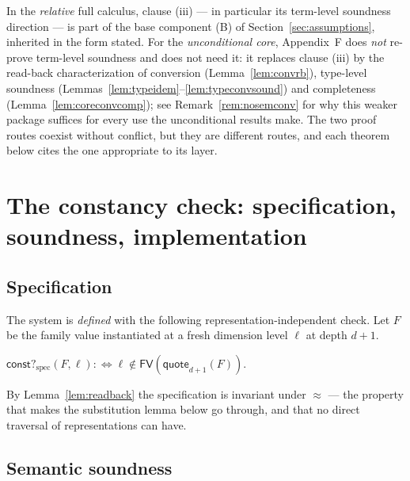 \documentclass{lmcs}
\newcommand{\FV}{\mathsf{FV}}
\newcommand{\repeq}{\approx}
\newcommand{\constspec}{\mathsf{const?}_{\mathrm{spec}}}
\newcommand{\quo}{\mathsf{quote}}
\begin{document}
\begin{rem}
  \label{rem:whichlayer}
  In the \emph{relative} full calculus, clause (iii) --- in
  particular its term-level soundness direction --- is part of the
  base component (B) of Section~\ref{sec:assumptions}, inherited in
  the form stated.  For the \emph{unconditional core}, Appendix~F
  does \emph{not} re-prove term-level soundness and does not need
  it: it replaces clause (iii) by the read-back characterization of
  conversion (Lemma~\ref{lem:convrb}), type-level soundness
  (Lemmas~\ref{lem:typeidem}--\ref{lem:typeconvsound}) and
  completeness (Lemma~\ref{lem:coreconvcomp}); see
  Remark~\ref{rem:nosemconv} for why this weaker package suffices
  for every use the unconditional results make.  The two proof
  routes coexist without conflict, but they are different routes,
  and each theorem below cites the one appropriate to its layer.
\end{rem}

\section{The constancy check: specification, soundness,
  implementation}
\label{sec:check}

\subsection{Specification}

The system is \emph{defined} with the following
representation-independent check.  Let $F$ be the family value
instantiated at a fresh dimension level $\ell$ at depth $d{+}1$.

\begin{defi}\label{def:spec}
  $\constspec(F, \ell) :\iff \ell \notin \FV(\quo_{d+1}(F))$.
\end{defi}

\noindent By Lemma~\ref{lem:readback} the specification is invariant
under $\repeq$ --- the property that makes the substitution lemma
below go through, and that no direct traversal of representations
can have.

\subsection{Semantic soundness}
\end{document}
